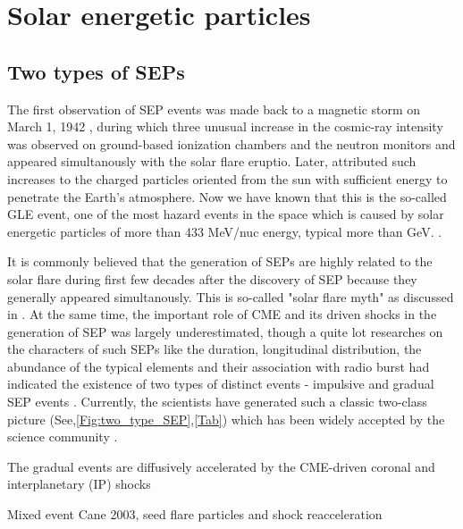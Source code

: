 \section{Solar energetic particles}

\subsection{Two types of SEPs}


The first observation of \ac{SEP} events was made back to a magnetic storm on March 1, 1942 \citet{lange1942note,forbush1942further}, during which three unusual increase in the cosmic-ray intensity was observed on ground-based ionization chambers and the neutron monitors and appeared simultanously with the solar flare eruptio. Later, \citep{Forbush1946} attributed such increases to the charged particles oriented from the sun with sufficient energy to penetrate the Earth's atmosphere. Now we have known that this is the so-called \ac{GLE} event, one of the most hazard events in the space which is caused by solar energetic particles of more than 433 MeV/nuc energy, typical more than GeV. \citet{meyer1956solar,Shea2012SSRv,gopalswamy2013first,thakur2014ground, Reames2013}.

It is commonly believed that the generation of \acp{SEP} are highly related to the solar flare during first few decades after the discovery of \ac{SEP} because they generally appeared simultanously. This is so-called "solar flare myth" as discussed in \citep{gosling1993the}. At the same time, the important role of CME and its driven shocks in the generation of \ac{SEP} was largely underestimated, though a quite lot researches on the characters of such \acp{SEP} like the duration, longitudinal distribution, the abundance of the typical elements and their association with radio burst had indicated the existence of two types of distinct events - impulsive and gradual \ac{SEP} events \citep{kahler1978prompt,kahler1984associations,cliver1982injection,cane1986two, reames1988ApJ}.
Currently, the scientists have generated such a classic two-class picture (See,\ref{Fig:two_type_SEP},\ref{Tab}) which has been widely accepted by the science community \citet{kallenrode2003current,reames2013two,Desai_Diacalone2016LRSP}. 

The gradual events are diffusively accelerated by the CME-driven coronal and interplanetary (IP) shocks

Mixed event Cane 2003, seed flare particles and shock reacceleration


